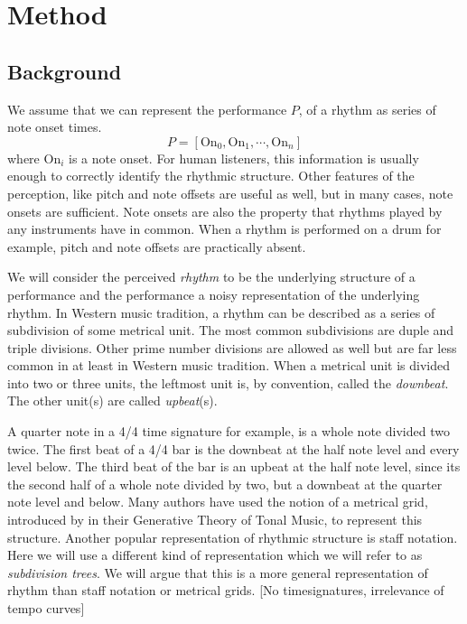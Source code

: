 \chapter{Method}
\label{sec:method}


\section{Background}

We assume that we can represent the performance $P$, of a rhythm as series of note onset times. 
\begin{equation}
\label{eq:performance}
P = [\mathrm{On}_0, \mathrm{On}_1, \cdots, \mathrm{On}_n]
\end{equation}
where $\mathrm{On}_i$ is a note onset. For human listeners, this information is usually enough to correctly identify the rhythmic structure. Other features of the perception, like pitch and note offsets are useful as well, but in many cases, note onsets are sufficient. Note onsets are also the property that rhythms played by any instruments have in common. When a rhythm is performed on a drum for example, pitch and note offsets are practically absent.

We will consider the perceived \textit{rhythm} to be the underlying structure of a performance and the performance a noisy representation of the underlying rhythm. In Western music tradition, a rhythm can be described as a series of subdivision of some metrical unit. The most common subdivisions are duple and triple divisions. Other prime number divisions are allowed as well but are far less common in at least in Western music tradition. When a metrical unit is divided into two or three units, the leftmost unit is, by convention, called the \textit{downbeat}. The other unit(s) are called \textit{upbeat}(s).

A quarter note in a 4/4 time signature for example, is a whole note divided two twice. The first beat of a 4/4 bar is the downbeat at the half note level and every level below. The third beat of the bar is an upbeat at the half note level, since its the second half of a whole note divided by two, but a downbeat at the quarter note level and below. Many authors have used the notion of a metrical grid, introduced by \citet{lerdahl1983generative} in their Generative Theory of Tonal Music, to represent this structure. Another popular representation of rhythmic structure is staff notation. Here we will use a different kind of representation which we will refer to as \textit{subdivision trees}. We will argue that this is a more general representation of rhythm than staff notation or metrical grids. [No timesignatures, irrelevance of tempo curves]

